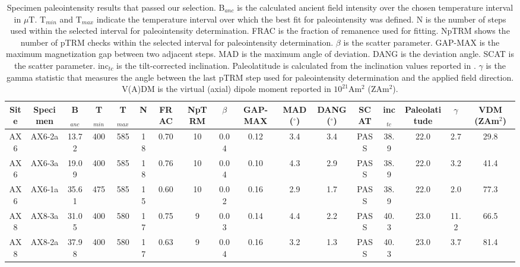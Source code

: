 \documentclass[9pt,twoside,lineno]{pnas-new}
\begin{document}
\clearpage

\begin{table}
\caption{\footnotesize{Specimen paleointensity results that passed our selection. B$_{anc}$ is the calculated ancient field intensity over the chosen temperature interval in $\mu$T. T$_{min}$ and T$_{max}$ indicate the temperature interval over which the best fit for paleointensity was defined. N is the number of steps used within the selected interval for paleointensity determination. FRAC is the fraction of remanence used for fitting. NpTRM shows the number of pTRM checks within the selected interval for paleointensity determination. $\beta$ is the scatter parameter. GAP-MAX is the maximum magnetization gap between two adjacent steps. MAD is the maximum angle of deviation. DANG is the deviation angle. SCAT is the scatter parameter. inc$_{tc}$ is the tilt-corrected inclination. Paleolatitude is calculated from the inclination values reported in \cite{Zhang2021b}. $\gamma$ is the gamma statistic that measures the angle between the last pTRM step used for paleointensity determination and the applied field direction. V(A)DM is the virtual (axial) dipole moment reported in $10^{21}$Am$^2$ (ZAm$^2$). }}
\centering
\begin{tabular}{ccccccccccccccccc}
\hline
Site & Specimen & B$_{anc}$ & T$_{min}$ & T$_{max}$ & N  & FRAC & NpTRM & $\beta$ & GAP-MAX & MAD ($^\circ$) & DANG ($^\circ$) & SCAT & inc$_{tc}$ & Paleolatitude & $\gamma$ & VDM (ZAm$^2$) \\
\hline
AX6  & AX6-2a   & 13.72     & 400       & 585       & 18 & 0.70 & 10    & 0.04    & 0.12    & 3.4            & 3.4             & PASS & 38.9       & 22.0          & 2.7      & 29.8          \\
AX6  & AX6-3a   & 19.09     & 400       & 585       & 18 & 0.76 & 10    & 0.04    & 0.10    & 4.3            & 2.9             & PASS & 38.9       & 22.0          & 3.2      & 41.4          \\
AX6  & AX6-1a   & 35.61     & 475       & 585       & 15 & 0.60 & 10    & 0.02    & 0.16    & 2.9            & 1.7             & PASS & 38.9       & 22.0          & 2.0      & 77.3          \\
AX8  & AX8-3a   & 31.05     & 400       & 580       & 17 & 0.75 & 9     & 0.03    & 0.14    & 4.4            & 2.2             & PASS & 40.3       & 23.0          & 11.2     & 66.5          \\
AX8  & AX8-2a   & 37.98     & 400       & 580       & 17 & 0.63 & 9     & 0.04    & 0.16    & 3.2            & 1.3             & PASS & 40.3       & 23.0          & 3.7      & 81.4          \\

\end{tabular}
\end{table}
\end{document}
